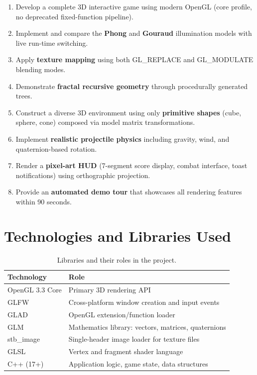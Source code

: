 \documentclass[12pt,a4paper]{article}
\begin{document}
\begin{enumerate}[noitemsep]
    \item Develop a complete 3D interactive game using modern OpenGL (core profile, no deprecated fixed-function pipeline).
    \item Implement and compare the \textbf{Phong} and \textbf{Gouraud} illumination models with live run-time switching.
    \item Apply \textbf{texture mapping} using both GL\_REPLACE and GL\_MODULATE blending modes.
    \item Demonstrate \textbf{fractal recursive geometry} through procedurally generated trees.
    \item Construct a diverse 3D environment using only \textbf{primitive shapes} (cube, sphere, cone) composed via model matrix transformations.
    \item Implement \textbf{realistic projectile physics} including gravity, wind, and quaternion-based rotation.
    \item Render a \textbf{pixel-art HUD} (7-segment score display, combat interface, toast notifications) using orthographic projection.
    \item Provide an \textbf{automated demo tour} that showcases all rendering features within 90 seconds.
\end{enumerate}

\section{Technologies and Libraries Used}

\begin{table}[h!]
\centering
\begin{tabular}{@{} l l @{}}
\toprule
\textbf{Technology} & \textbf{Role} \\
\midrule
OpenGL 3.3 Core & Primary 3D rendering API \\
GLFW            & Cross-platform window creation and input events \\
GLAD            & OpenGL extension/function loader \\
GLM             & Mathematics library: vectors, matrices, quaternions \\
stb\_image      & Single-header image loader for texture files \\
GLSL            & Vertex and fragment shader language \\
C++ (17+)       & Application logic, game state, data structures \\
\bottomrule
\end{tabular}
\caption{Libraries and their roles in the project.}
\end{table}
\end{document}
